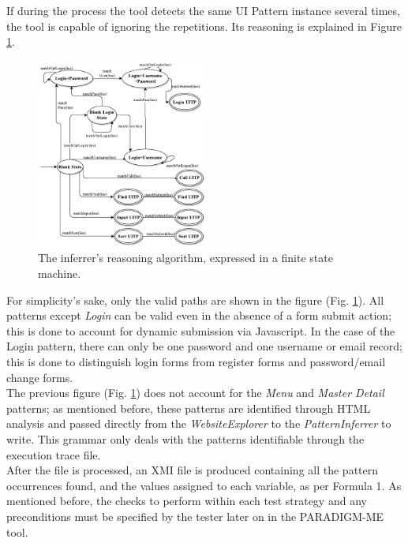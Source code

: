 \documentclass[conference]{IEEEtran}
\begin{document}
If during the process the tool detects the same UI Pattern instance several times, the tool is capable of ignoring the repetitions. Its reasoning is explained in Figure \ref{fig:inferrer}.\\

\begin{figure}[!htb]
\centering
\includegraphics[width=0.5\textwidth]{Global_State_Machine.pdf}
\caption{The inferrer's reasoning algorithm, expressed in a finite state machine.}
\label{fig:inferrer}
\end{figure}

For simplicity's sake, only the valid paths are shown in the figure (Fig. \ref{fig:inferrer}). All patterns except \textit{Login} can be valid even in the absence of a form submit action; this is done to account for dynamic submission via Javascript. In the case of the Login pattern, there can only be one password and one username or email record; this is done to distinguish login forms from register forms and password/email change forms.\\

The previous figure (Fig. \ref{fig:inferrer}) does not account for the \textit{Menu} and \textit{Master Detail} patterns; as mentioned before, these patterns are identified through HTML analysis and passed directly from the \textit{WebsiteExplorer} to the \textit{PatternInferrer} to write. This grammar only deals with the patterns identifiable through the execution trace file.\\

After the file is processed, an XMI file is produced containing all the pattern occurrences found, and the values assigned to each variable, as per Formula 1.%
As mentioned before, the checks to perform within each test strategy and any preconditions must be specified by the tester later on in the PARADIGM-ME tool.\\
\end{document}
